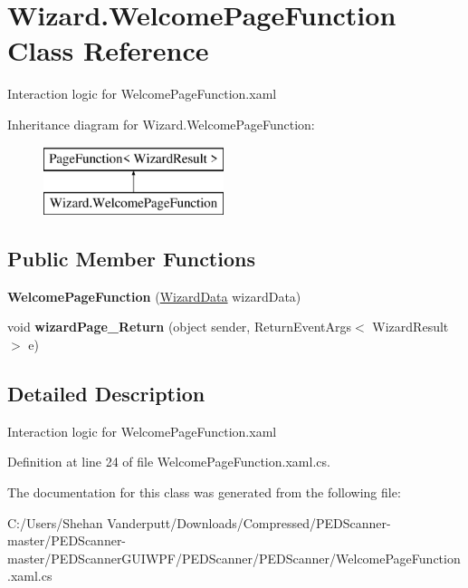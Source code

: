 \hypertarget{class_wizard_1_1_welcome_page_function}{}\section{Wizard.\+Welcome\+Page\+Function Class Reference}
\label{class_wizard_1_1_welcome_page_function}


Interaction logic for Welcome\+Page\+Function.\+xaml  


Inheritance diagram for Wizard.\+Welcome\+Page\+Function\+:\begin{figure}[H]
\begin{center}
\leavevmode
\includegraphics[height=2.000000cm]{class_wizard_1_1_welcome_page_function}
\end{center}
\end{figure}
\subsection*{Public Member Functions}
\begin{DoxyCompactItemize}
\item 
\mbox{\label{class_wizard_1_1_welcome_page_function_a76a28a62c6b572604a83ea819123cfdb}} 
{\bfseries Welcome\+Page\+Function} (\mbox{\hyperlink{class_wizard_1_1_wizard_data}{Wizard\+Data}} wizard\+Data)
\item 
\mbox{\label{class_wizard_1_1_welcome_page_function_a4b4237e738fc47d3d41cb68e58f82623}} 
void {\bfseries wizard\+Page\+\_\+\+Return} (object sender, Return\+Event\+Args$<$ Wizard\+Result $>$ e)
\end{DoxyCompactItemize}


\subsection{Detailed Description}
Interaction logic for Welcome\+Page\+Function.\+xaml 

Definition at line 24 of file Welcome\+Page\+Function.\+xaml.\+cs.



The documentation for this class was generated from the following file\+:\begin{DoxyCompactItemize}
\item 
C\+:/\+Users/\+Shehan Vanderputt/\+Downloads/\+Compressed/\+P\+E\+D\+Scanner-\/master/\+P\+E\+D\+Scanner-\/master/\+P\+E\+D\+Scanner\+G\+U\+I\+W\+P\+F/\+P\+E\+D\+Scanner/\+P\+E\+D\+Scanner/Welcome\+Page\+Function.\+xaml.\+cs\end{DoxyCompactItemize}
